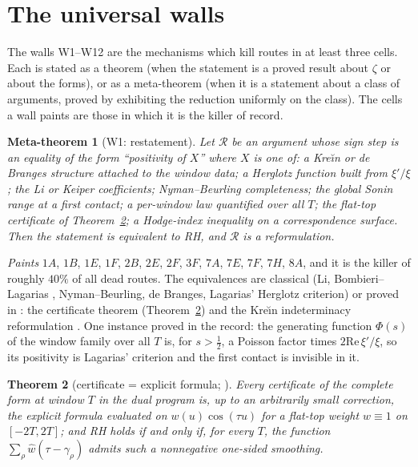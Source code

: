 \documentclass[11pt]{amsart}
\newtheorem{theorem}{Theorem}[section]
\newtheorem{metatheorem}[theorem]{Meta-theorem}
\theoremstyle{definition}
\theoremstyle{remark}
\newcommand{\Rel}{\mathrm{Re}\,}
\begin{document}
\section{The universal walls}\label{sec:walls}

The walls W1--W12 are the mechanisms which kill routes in at least three cells. Each is stated as a
theorem (when the statement is a proved result about $\zeta$ or about the forms), or as a meta-theorem
(when it is a statement about a class of arguments, proved by exhibiting the reduction uniformly on the
class). The cells a wall paints are those in which it is the killer of record.

\begin{metatheorem}[W1: restatement]\label{W1}
Let $\mathcal R$ be an argument whose sign step is an equality of the form ``positivity of $X$'' where $X$
is one of: a Kre\u{\i}n or de Branges structure attached to the window data; a Herglotz function built
from $\xi'/\xi$; the Li or Keiper coefficients; Nyman--Beurling completeness; the global Sonin range at a
first contact; a per-window law quantified over all $T$; the flat-top certificate of
Theorem~\ref{thm:Z}; a Hodge-index inequality on a correspondence surface. Then the statement is
equivalent to RH, and $\mathcal R$ is a reformulation.
\end{metatheorem}
\noindent\emph{Paints} $1A$, $1B$, $1E$, $1F$, $2B$, $2E$, $2F$, $3F$, $7A$, $7E$, $7F$, $7H$, $8A$, and it is the
killer of roughly $40\%$ of all dead routes. The equivalences are classical (Li, Bombieri--Lagarias
\cite{BombieriLagarias1999}, Nyman--Beurling, de Branges, Lagarias' Herglotz criterion) or proved in
\cite{Paper47}: the certificate theorem (Theorem~\ref{thm:Z}) and the Kre\u{\i}n indeterminacy
reformulation \cite[Thm.~8.5]{Paper47}. One instance proved in the record: the generating
function $\Phi(s)$ of the window family over all $T$ is, for $s>\frac12$, a Poisson factor times
$2\Rel\xi'/\xi$, so its positivity is Lagarias' criterion and the first contact is invisible in it.

\begin{theorem}[certificate = explicit formula; ]\label{thm:Z}
Every certificate of the complete form at window $T$ in the dual program is, up to an arbitrarily small
correction, the explicit formula evaluated on $w(u)\cos(\tau u)$ for a flat-top weight $w\equiv1$ on
$[-2T,2T]$; and RH holds if and only if, for every $T$, the function $\sum_\rho\widehat w(\tau-\gamma_\rho)$
admits such a nonnegative one-sided smoothing.
\end{theorem}
\end{document}
